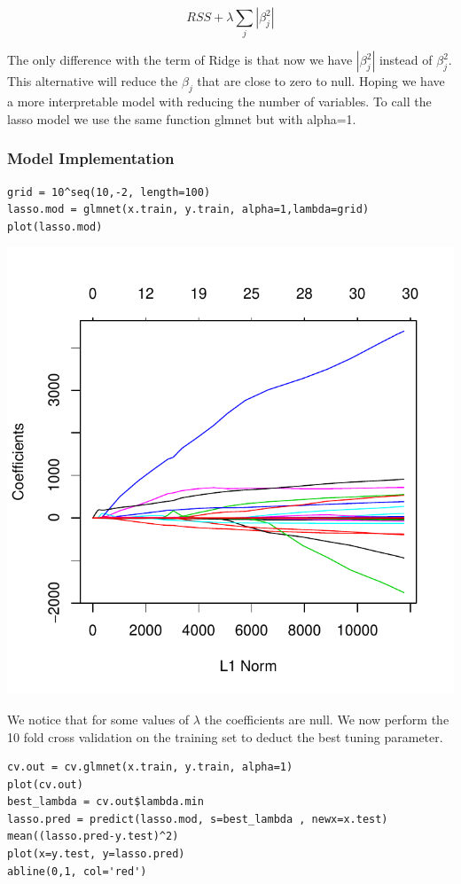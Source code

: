 \documentclass[]{report}
\begin{document}
\begin{equation} \label{eq2}
	RSS + \lambda \sum_{j}{|\beta_{j}^{2}|}
\end{equation}	

The only difference with the term of Ridge is that now we have $|\beta_{j}^{2}|$ instead of $\beta_{j}^{2}$. This alternative will reduce the $\beta_{j}$ that are close to zero to null.
Hoping we have a more interpretable model with reducing the number of variables. To call the lasso model we use the same function glmnet but with alpha=1.
 
\subsubsection{Model Implementation}
\begin{lstlisting}
grid = 10^seq(10,-2, length=100)
lasso.mod = glmnet(x.train, y.train, alpha=1,lambda=grid)
plot(lasso.mod)
\end{lstlisting}

\begin{center}
	\includegraphics[width=0.8\linewidth]{Figures/lasso_model.pdf}
\end{center}

We notice that for some values of $\lambda$ the coefficients are null. We now perform the 10 fold cross validation on the training set to deduct the best tuning parameter.

\begin{lstlisting}
cv.out = cv.glmnet(x.train, y.train, alpha=1)
plot(cv.out)
best_lambda = cv.out$lambda.min 
lasso.pred = predict(lasso.mod, s=best_lambda , newx=x.test)
mean((lasso.pred-y.test)^2)
plot(x=y.test, y=lasso.pred)
abline(0,1, col='red')
\end{lstlisting}
\end{document}
